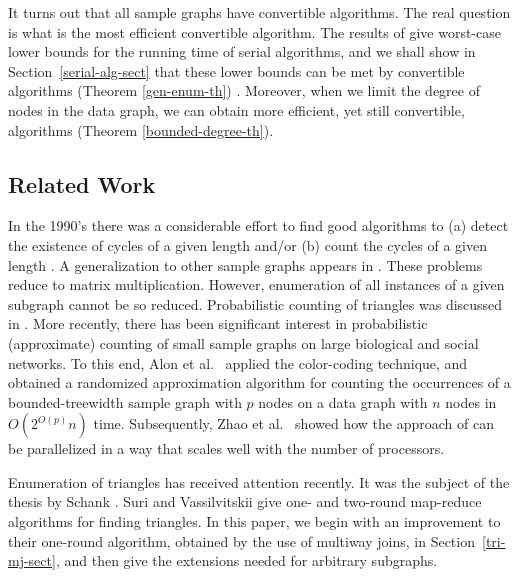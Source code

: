 It turns out that all sample graphs have convertible algorithms.  The real question is what is the most efficient convertible algorithm.  The results of \cite{Alon81} give worst-case lower bounds for the running time of serial algorithms, and we shall show in Section~\ref{serial-alg-sect} that these lower bounds can be met by convertible algorithms (Theorem \ref{gen-enum-th}) . Moreover, when we limit the degree of nodes in the data graph, we can obtain more efficient, yet still convertible, algorithms (Theorem \ref{bounded-degree-th}).


\subsection{Related Work}
\label{rel-work-subsect}

In the 1990's there was a considerable effort to find good algorithms to (a) detect the existence of cycles of a given length and/or (b) count the cycles of a given length \cite{AYZ97}.  A generalization to other sample graphs appears in \cite{KLL11}. These problems reduce to matrix multiplication.  However, enumeration of all instances of a given subgraph cannot be so reduced.  Probabilistic counting of triangles was discussed in \cite{CTKMF09}.
More recently, there has been significant interest in probabilistic (approximate) counting of small sample graphs on large biological and social networks.  To this end, Alon et al.\ \cite{AlonDHHS08} applied the color-coding technique, and obtained a randomized approximation algorithm for counting the occurrences of a bounded-treewidth sample graph with $p$ nodes on a data graph with $n$ nodes in $O(2^{O(p)} n)$ time. Subsequently, Zhao et al.\ \cite{ZhaoKKM10} showed how the approach of \cite{AlonDHHS08} can be parallelized in a way that scales well with the number of processors.

Enumeration of triangles has received attention recently.   It was the subject of the thesis by Schank \cite{Schank07}.
Suri and Vassilvitskii \cite{SV11} give one- and two-round map-reduce algorithms for finding triangles. In this paper, we begin with an improvement to their one-round algorithm, obtained by the use of multiway joins, in Section~\ref{tri-mj-sect}, and then give the extensions needed for arbitrary subgraphs.


